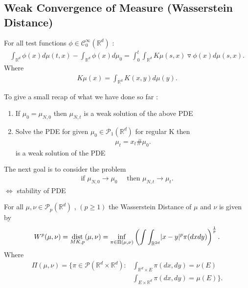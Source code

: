 \subsection{Weak Convergence of Measure (Wasserstein Distance)}
\begin{definition}
 For all test functions $\phi  \in  \mathcal{C}_0^{\infty }(\mathbb{R}^{d} ) $ :
 \begin{align*}
   \int_{\mathbb{R}^{d } } \phi(x) d\mu(t,x) - \int_{\mathbb{R}^{d}} \phi(x) d\mu_0 = \int_{0}^{t} \int_{\mathbb{R}^{d} }  K\mu(s,x) \triangledown \phi(x) d\mu(s,x) 
 .\end{align*}
 Where 
 \begin{align*}
   K\mu(x) = \int_{\mathbb{R}^{d} } K(x,y) d\mu(y)
 .\end{align*}
\end{definition}
To give a small recap of what we have done so far : 
\begin{enumerate}
  \item If $\mu_{0} = \mu_{N,0} $  then $\mu_{N,t}$ is a weak solution of the above PDE 
  \item Solve the PDE for given $\mu_0 \in  \mathcal{P}_1(\mathbb{R}^{d } )$ for regular K then 
    \begin{align*}
     \mu_t = x_t \# \mu_0 
    .\end{align*}
    is a weak solution of the PDE
\end{enumerate}
The next goal is to consider the problem  
\begin{align*}
  \text{if } \mu_{N,0} \to \mu_0 \quad \text{ then } \mu_{N,t} \to \mu_t
.\end{align*}
$\Leftrightarrow$ stability of PDE
\begin{definition}
  For all $\mu , \nu  \in  \mathcal{P}_p(\mathbb{R}^{d} )$  , $(p\ge 1) $ the Wasserstein Distance of $\mu $ and $\nu $ is given by 
  \begin{align*}
    W^{p}(\mu ,\nu ) = \operatorname*{dist}_{MK,p}(\mu ,\nu ) = \inf_{\pi \in  \Pi(\mu ,\nu )} \left( \int \int_{\mathbb{R}^{2d} } \lvert x-y\rvert^{p} \pi(dxdy) \right)^{\frac{1}{p}}  
  .\end{align*}
  Where  
  \begin{align*}
    \Pi(\mu ,\nu ) = \{\pi \in \mathcal{P}(\mathbb{R}^{d} \times  \mathbb{R}^{d}  ) : &\int_{\mathbb{R}^{d}\times E } \pi(dx,dy) = \nu(E) \\
                                                                                      &\int_{E \times  \mathbb{R}^{d} } \pi(dx,dy) = \mu(E)\}  
  .\end{align*}
\end{definition}
